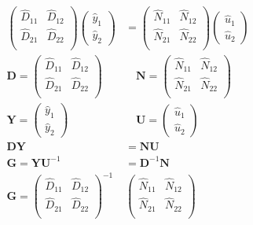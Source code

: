\documentclass[a4paper,12pt]{article}
\begin{document}
\begin{enumerate}
\begin{align*}
            \begin{pmatrix}
              \hat D_{11} & \hat D_{12} \\
              \hat D_{21} & \hat D_{22} \\
             \end{pmatrix}
            \begin{pmatrix}
              \hat y_1 \\
              \hat y_2
             \end{pmatrix}
             &=
            \begin{pmatrix}
              \hat N_{11} & \hat N_{12} \\
              \hat N_{21} & \hat N_{22} \\
             \end{pmatrix}
             \begin{pmatrix}
              \hat u_1 \\
              \hat u_2
             \end{pmatrix}
\\
\mathbf D = \begin{pmatrix}
              \hat D_{11} & \hat D_{12} \\
              \hat D_{21} & \hat D_{22} \\
             \end{pmatrix}
             & \quad
\mathbf N = \begin{pmatrix}
              \hat N_{11} & \hat N_{12} \\
              \hat N_{21} & \hat N_{22} \\
             \end{pmatrix}
             \\
\mathbf Y = \begin{pmatrix}
              \hat y_1 \\
              \hat y_2
             \end{pmatrix}
             & \quad
\mathbf U = \begin{pmatrix}
              \hat u_1 \\
              \hat u_2
             \end{pmatrix}
             \\
\mathbf D \mathbf Y &= \mathbf N \mathbf U\\
\mathbf G = \mathbf Y \mathbf U ^{-1} &= \mathbf D ^{-1} \mathbf N\\
\mathbf G = \begin{pmatrix}
              \hat D_{11} & \hat D_{12} \\
              \hat D_{21} & \hat D_{22} \\
             \end{pmatrix} ^{-1}
             &
             \begin{pmatrix}
              \hat N_{11} & \hat N_{12} \\
              \hat N_{21} & \hat N_{22} \\
             \end{pmatrix}
\end{align*}


 \end{enumerate}





\printbibliography
\end{document}
